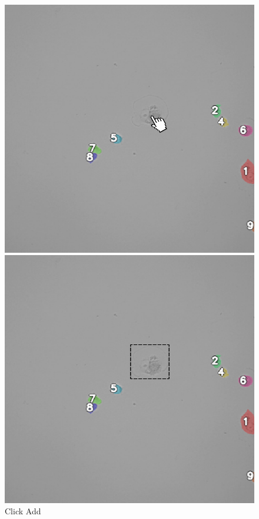 \documentclass[../cellseek_paper.tex]{subfiles}
\begin{document}
\begin{figure}[H]
  \centering
  \begin{minipage}[b]{0.32\textwidth}
    \centering
    \includegraphics[width=\textwidth]{images/ui/click_on_cell.jpg}
    \caption*{Click Add}
  \end{minipage}
  \hfill
  \begin{minipage}[b]{0.32\textwidth}
    \centering
    \includegraphics[width=\textwidth]{images/ui/box_on_cell.jpg}

\end{minipage}
\end{figure}
\end{document}
